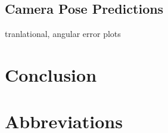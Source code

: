 \documentclass[final]{cvpr}
\begin{document}
\subsection{Camera Pose Predictions}
tranlational, angular error
plots

\section{Conclusion}

\section*{Abbreviations}
\begin{acronym}
\end{acronym}

{\small


}
\end{document}
